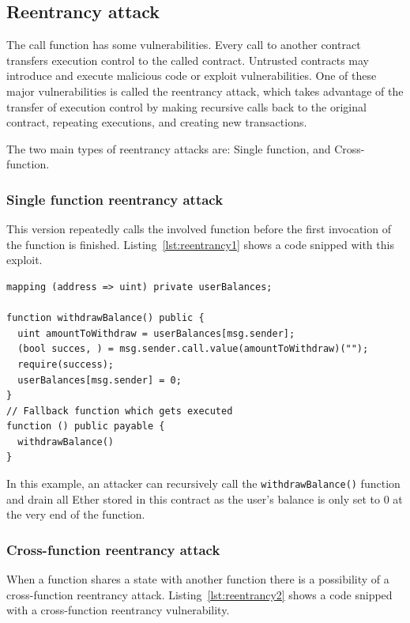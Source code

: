 \documentclass[10pt,conference]{IEEEtran}
\begin{document}
\subsection{Reentrancy attack}

The call function has some vulnerabilities. Every call to another contract transfers execution control to the called contract. Untrusted contracts may introduce and execute malicious code or exploit vulnerabilities. One of these major vulnerabilities is called the reentrancy attack, which takes advantage of the transfer of execution control by making recursive calls back to the original contract, repeating executions, and creating new transactions.

The two main types of reentrancy attacks are: Single function, and Cross-function.

\subsubsection{Single function reentrancy attack}
This version repeatedly calls the involved function before the first invocation of the function is finished.  Listing~\ref{lst:reentrancy1} shows a code snipped with this exploit.

\begin{lstlisting}[language=Solidity, caption=Single function reentrancy attack, label=lst:reentrancy1]
mapping (address => uint) private userBalances;

function withdrawBalance() public {
  uint amountToWithdraw = userBalances[msg.sender];
  (bool succes, ) = msg.sender.call.value(amountToWithdraw)("");
  require(success);
  userBalances[msg.sender] = 0;
}
// Fallback function which gets executed
function () public payable {
  withdrawBalance()
}
\end{lstlisting}

In this example,  an attacker can recursively call the \texttt{withdrawBalance()} function and drain all Ether stored in this contract as the user's balance is only set to 0 at the very end of the function.

\subsubsection{Cross-function reentrancy attack}
When a function shares a state with another function there is a possibility of a cross-function reentrancy attack.  Listing~\ref{lst:reentrancy2}  shows a code snipped with a cross-function reentrancy vulnerability. 
\end{document}
